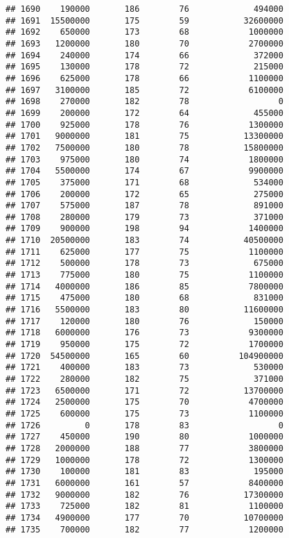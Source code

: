 \documentclass[
]{article}
\begin{document}
\begin{verbatim}
## 1690    190000       186        76             494000
## 1691  15500000       175        59           32600000
## 1692    650000       173        68            1000000
## 1693   1200000       180        70            2700000
## 1694    240000       174        66             372000
## 1695    130000       178        72             215000
## 1696    625000       178        66            1100000
## 1697   3100000       185        72            6100000
## 1698    270000       182        78                  0
## 1699    200000       172        64             455000
## 1700    925000       178        76            1300000
## 1701   9000000       181        75           13300000
## 1702   7500000       180        78           15800000
## 1703    975000       180        74            1800000
## 1704   5500000       174        67            9900000
## 1705    375000       171        68             534000
## 1706    200000       172        65             275000
## 1707    575000       187        78             891000
## 1708    280000       179        73             371000
## 1709    900000       198        94            1400000
## 1710  20500000       183        74           40500000
## 1711    625000       177        75            1100000
## 1712    500000       178        73             675000
## 1713    775000       180        75            1100000
## 1714   4000000       186        85            7800000
## 1715    475000       180        68             831000
## 1716   5500000       183        80           11600000
## 1717    120000       180        76             150000
## 1718   6000000       176        73            9300000
## 1719    950000       175        72            1700000
## 1720  54500000       165        60          104900000
## 1721    400000       183        73             530000
## 1722    280000       182        75             371000
## 1723   6500000       171        72           13700000
## 1724   2500000       175        70            4700000
## 1725    600000       175        73            1100000
## 1726         0       178        83                  0
## 1727    450000       190        80            1000000
## 1728   2000000       188        77            3800000
## 1729   1000000       178        72            1300000
## 1730    100000       181        83             195000
## 1731   6000000       161        57            8400000
## 1732   9000000       182        76           17300000
## 1733    725000       182        81            1100000
## 1734   4900000       177        70           10700000
## 1735    700000       182        77            1200000

\end{verbatim}
\end{document}
